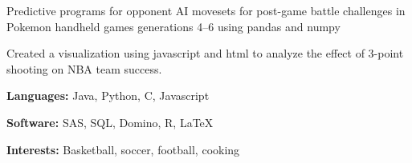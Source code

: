\documentclass{resume}
\begin{document}
\begin{projects}
    \begin{description}
        \item Predictive programs for opponent AI movesets for post-game battle challenges in Pokemon handheld games generations 4--6 using pandas and numpy
    \end{description}
    \begin{description}
        \item Created a visualization using javascript and html to analyze the effect of 3-point shooting on NBA team success. 
    \end{description}

\end{projects}


\begin{skills}
    \begin{description}
	\item \textbf{Languages:} Java, Python, C, Javascript
        \item \textbf{Software:} SAS, SQL, Domino, R, LaTeX
        \item \textbf{Interests:} Basketball, soccer, football, cooking
    \end{description}
\end{skills}
\end{document}
